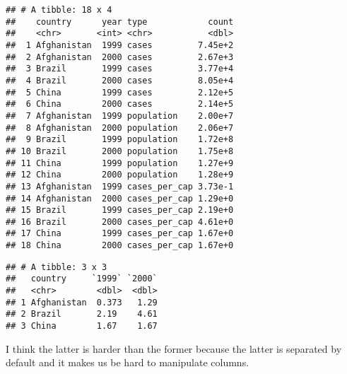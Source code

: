 \documentclass[]{ltjsarticle}
\newenvironment{Shaded}{\begin{snugshade}}{\end{snugshade}}
\newcommand{\DataTypeTok}[1]{\textcolor[rgb]{0.13,0.29,0.53}{#1}}
\newcommand{\DecValTok}[1]{\textcolor[rgb]{0.00,0.00,0.81}{#1}}
\newcommand{\KeywordTok}[1]{\textcolor[rgb]{0.13,0.29,0.53}{\textbf{#1}}}
\newcommand{\NormalTok}[1]{#1}
\newcommand{\OperatorTok}[1]{\textcolor[rgb]{0.81,0.36,0.00}{\textbf{#1}}}
\newcommand{\StringTok}[1]{\textcolor[rgb]{0.31,0.60,0.02}{#1}}
\begin{document}
\begin{verbatim}
## # A tibble: 18 x 4
##    country      year type            count
##    <chr>       <int> <chr>           <dbl>
##  1 Afghanistan  1999 cases         7.45e+2
##  2 Afghanistan  2000 cases         2.67e+3
##  3 Brazil       1999 cases         3.77e+4
##  4 Brazil       2000 cases         8.05e+4
##  5 China        1999 cases         2.12e+5
##  6 China        2000 cases         2.14e+5
##  7 Afghanistan  1999 population    2.00e+7
##  8 Afghanistan  2000 population    2.06e+7
##  9 Brazil       1999 population    1.72e+8
## 10 Brazil       2000 population    1.75e+8
## 11 China        1999 population    1.27e+9
## 12 China        2000 population    1.28e+9
## 13 Afghanistan  1999 cases_per_cap 3.73e-1
## 14 Afghanistan  2000 cases_per_cap 1.29e+0
## 15 Brazil       1999 cases_per_cap 2.19e+0
## 16 Brazil       2000 cases_per_cap 4.61e+0
## 17 China        1999 cases_per_cap 1.67e+0
## 18 China        2000 cases_per_cap 1.67e+0
\end{verbatim}

\begin{Shaded}
\end{Shaded}

\begin{verbatim}
## # A tibble: 3 x 3
##   country     `1999` `2000`
##   <chr>        <dbl>  <dbl>
## 1 Afghanistan  0.373   1.29
## 2 Brazil       2.19    4.61
## 3 China        1.67    1.67
\end{verbatim}

I think the latter is harder than the former because the latter is
separated by default and it makes us be hard to manipulate columns.
\end{document}
